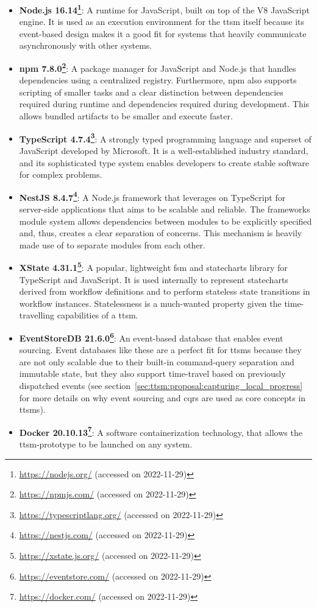\begin{itemize}
    \item \textbf{Node.js 16.14\footnote{\url{https://nodejs.org/} (accessed on 2022-11-29)}}: A runtime for JavaScript, built on top of the V8 JavaScript engine. It is used as an execution environment for the \gls{ttsm} itself because its event-based design makes it a good fit for systems that heavily communicate asynchronously with other systems.
    \item \textbf{npm 7.8.0\footnote{\url{https://npmjs.com/} (accessed on 2022-11-29)}}: A package manager for JavaScript and Node.js that handles dependencies using a centralized registry. Furthermore, npm also supports scripting of smaller tasks and a clear distinction between dependencies required during runtime and dependencies required during development. This allows bundled artifacts to be smaller and execute faster.
    \item \textbf{TypeScript 4.7.4\footnote{\url{https://typescriptlang.org/} (accessed on 2022-11-29)}}: A strongly typed programming language and superset of JavaScript developed by Microsoft. It is a well-established industry standard, and its sophisticated type system enables developers to create stable software for complex problems.
    \item \textbf{NestJS 8.4.7\footnote{\url{https://nestjs.com/} (accessed on 2022-11-29)}}: A Node.js framework that leverages on TypeScript for server-side applications that aims to be scalable and reliable. The frameworks module system allows dependencies between modules to be explicitly specified and, thus, creates a clear separation of concerns. This mechanism is heavily made use of to separate modules from each other.
    \item \textbf{XState 4.31.1\footnote{\url{https://xstate.js.org/} (accessed on 2022-11-29)}}: A popular, lightweight \gls{fsm} and statecharts library for TypeScript and JavaScript. It is used internally to represent statecharts derived from workflow definitions and to perform stateless state transitions in workflow instances. Statelessness is a much-wanted property given the time-travelling capabilities of a \gls{ttsm}.
    \item \textbf{EventStoreDB 21.6.0\footnote{\url{https://eventstore.com/} (accessed on 2022-11-29)}}: An event-based database that enables event sourcing. Event databases like these are a perfect fit for \glspl{ttsm} because they are not only scalable due to their built-in command-query separation and immutable state, but they also support time-travel based on previously dispatched events (see section~\ref{sec:ttsm:proposal:capturing_local_progress} for more details on why event sourcing and \gls{cqrs} are used as core concepts in \glspl{ttsm}).
    \item \textbf{Docker 20.10.13\footnote{\url{https://docker.com/} (accessed on 2022-11-29)}}: A software containerization technology, that allows the \gls{ttsm}-prototype to be launched on any system.
\end{itemize}

